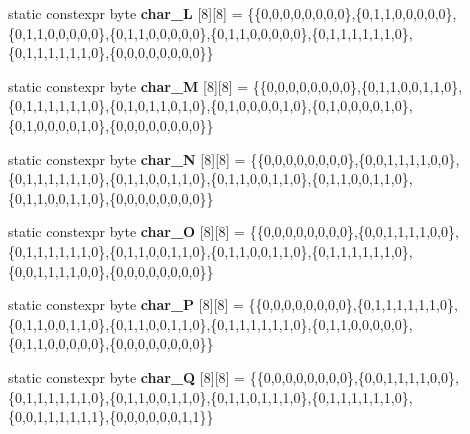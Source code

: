 \begin{DoxyCompactItemize}
\item 
static constexpr byte {\bfseries char\+\_\+L} \mbox{[}8\mbox{]}\mbox{[}8\mbox{]} = \{\{0,0,0,0,0,0,0,0\},\{0,1,1,0,0,0,0,0\},\{0,1,1,0,0,0,0,0\},\{0,1,1,0,0,0,0,0\},\{0,1,1,0,0,0,0,0\},\{0,1,1,1,1,1,1,0\},\{0,1,1,1,1,1,1,0\},\{0,0,0,0,0,0,0,0\}\}\hypertarget{classcharacters_af5ab128d359d704ae7d37f286f8c798b}{}\label{classcharacters_af5ab128d359d704ae7d37f286f8c798b}

\item 
static constexpr byte {\bfseries char\+\_\+M} \mbox{[}8\mbox{]}\mbox{[}8\mbox{]} = \{\{0,0,0,0,0,0,0,0\},\{0,1,1,0,0,1,1,0\},\{0,1,1,1,1,1,1,0\},\{0,1,0,1,1,0,1,0\},\{0,1,0,0,0,0,1,0\},\{0,1,0,0,0,0,1,0\},\{0,1,0,0,0,0,1,0\},\{0,0,0,0,0,0,0,0\}\}\hypertarget{classcharacters_ad689d251d1142d2e623daefac81c8787}{}\label{classcharacters_ad689d251d1142d2e623daefac81c8787}

\item 
static constexpr byte {\bfseries char\+\_\+N} \mbox{[}8\mbox{]}\mbox{[}8\mbox{]} = \{\{0,0,0,0,0,0,0,0\},\{0,0,1,1,1,1,0,0\},\{0,1,1,1,1,1,1,0\},\{0,1,1,0,0,1,1,0\},\{0,1,1,0,0,1,1,0\},\{0,1,1,0,0,1,1,0\},\{0,1,1,0,0,1,1,0\},\{0,0,0,0,0,0,0,0\}\}\hypertarget{classcharacters_a72e2aa20c0e10b57bf43a0e5d7858c29}{}\label{classcharacters_a72e2aa20c0e10b57bf43a0e5d7858c29}

\item 
static constexpr byte {\bfseries char\+\_\+O} \mbox{[}8\mbox{]}\mbox{[}8\mbox{]} = \{\{0,0,0,0,0,0,0,0\},\{0,0,1,1,1,1,0,0\},\{0,1,1,1,1,1,1,0\},\{0,1,1,0,0,1,1,0\},\{0,1,1,0,0,1,1,0\},\{0,1,1,1,1,1,1,0\},\{0,0,1,1,1,1,0,0\},\{0,0,0,0,0,0,0,0\}\}\hypertarget{classcharacters_af47ef278a06cfc18587aa8984b6ea1e5}{}\label{classcharacters_af47ef278a06cfc18587aa8984b6ea1e5}

\item 
static constexpr byte {\bfseries char\+\_\+P} \mbox{[}8\mbox{]}\mbox{[}8\mbox{]} = \{\{0,0,0,0,0,0,0,0\},\{0,1,1,1,1,1,1,0\},\{0,1,1,0,0,1,1,0\},\{0,1,1,0,0,1,1,0\},\{0,1,1,1,1,1,1,0\},\{0,1,1,0,0,0,0,0\},\{0,1,1,0,0,0,0,0\},\{0,0,0,0,0,0,0,0\}\}\hypertarget{classcharacters_ac7d1330ca83d52dff218beefed0daebc}{}\label{classcharacters_ac7d1330ca83d52dff218beefed0daebc}

\item 
static constexpr byte {\bfseries char\+\_\+Q} \mbox{[}8\mbox{]}\mbox{[}8\mbox{]} = \{\{0,0,0,0,0,0,0,0\},\{0,0,1,1,1,1,0,0\},\{0,1,1,1,1,1,1,0\},\{0,1,1,0,0,1,1,0\},\{0,1,1,0,1,1,1,0\},\{0,1,1,1,1,1,1,0\},\{0,0,1,1,1,1,1,1\},\{0,0,0,0,0,0,1,1\}\}\hypertarget{classcharacters_a76121554d4b75e0b4e959fd02b0ae29f}{}\label{classcharacters_a76121554d4b75e0b4e959fd02b0ae29f}


\end{DoxyCompactItemize}
